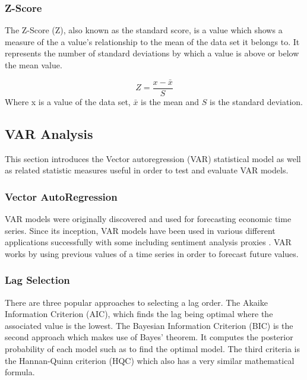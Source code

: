 \subsubsection{Z-Score}

The Z-Score (Z), also known as the standard score, is a value which shows a measure of the a value's relationship to the mean of the data set it belongs to. It represents the number of standard deviations by which a value is above or below the mean value.

\begin{equation}
    Z = \frac{x - \bar{x}}{S}
\end{equation}
Where x is a value of the data set, $\bar{x}$ is the mean and $S$ is the standard deviation.

\subsection{VAR Analysis}\label{chap:var lit rv}

This section introduces the Vector autoregression (VAR) statistical model as well as related statistic measures useful in order to test and evaluate VAR models.

\subsubsection{Vector AutoRegression}

VAR models were originally discovered and used for forecasting economic time series. Since its inception, VAR models have been used in various different applications successfully with some including sentiment analysis proxies \citep{georgoula2015using,zhao2015computational}. VAR works by using previous values of a time series in order to forecast future values.


\subsubsection{Lag Selection}\label{chap:lag selection lr}

There are three popular approaches to selecting a lag order. The Akaike Information Criterion (AIC), which finds the lag being optimal where the associated value is the lowest. The Bayesian Information Criterion (BIC) is the second approach which makes use of Bayes' theorem. It computes the posterior probability of each model such as to find the optimal model. The third criteria is the Hannan-Quinn criterion (HQC) which also has a very similar mathematical formula.

